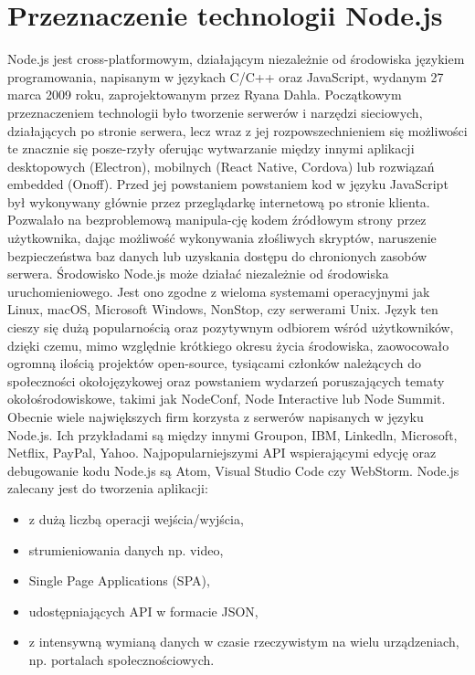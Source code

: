 \documentclass[12pt]{report}
\begin{document}
  \section{Przeznaczenie technologii Node.js}
    Node.js jest cross-platformowym, działającym niezależnie od środowiska językiem programowania, napisanym w językach C/C++ oraz JavaScript, wydanym 27 marca 2009 roku, zaprojektowanym przez Ryana Dahla.
    Początkowym przeznaczeniem technologii było tworzenie serwerów i narzędzi sieciowych, działających po stronie serwera, lecz wraz z jej rozpowszechnieniem się możliwości te znacznie się posze-rzyły oferując wytwarzanie między innymi aplikacji desktopowych (Electron), mobilnych (React Native, Cordova) lub rozwiązań embedded (Onoff).
    Przed jej powstaniem powstaniem kod w języku JavaScript był wykonywany głównie przez przeglądarkę internetową po stronie klienta. Pozwalało na bezproblemową manipula-cję kodem źródłowym strony przez użytkownika, dając możliwość wykonywania złośliwych skryptów, naruszenie bezpieczeństwa baz danych lub uzyskania dostępu do chronionych zasobów serwera.
    Środowisko Node.js może działać niezależnie od środowiska uruchomieniowego.
    Jest ono zgodne z wieloma systemami operacyjnymi jak  Linux, macOS, Microsoft Windows, NonStop, czy serwerami Unix.
    Język ten cieszy się dużą popularnością oraz pozytywnym odbiorem wśród użytkowników, dzięki czemu, mimo względnie krótkiego okresu życia środowiska, zaowocowało ogromną ilością projektów open-source, tysiącami członków należących do społeczności okołojęzykowej oraz powstaniem wydarzeń poruszających tematy okołośrodowiskowe, takimi jak NodeConf, Node Interactive lub Node Summit.
    Obecnie wiele największych firm korzysta z serwerów napisanych w języku Node.js.
    Ich przykładami są między innymi Groupon, IBM, Linkedln, Microsoft, Netflix, PayPal, Yahoo.
    Najpopularniejszymi API wspierającymi edycję oraz debugowanie kodu Node.js są Atom, Visual Studio Code czy WebStorm.
    \newline Node.js zalecany jest do tworzenia aplikacji: 
    \begin{itemize}
      \item z dużą liczbą operacji wejścia/wyjścia,
      \item strumieniowania danych np. video, 
      \item Single Page Applications (SPA),
      \item udostępniających API w formacie JSON,
      \item z intensywną wymianą danych w czasie rzeczywistym na wielu urządzeniach, np. portalach społecznościowych.
    \end{itemize} 
\end{document}
